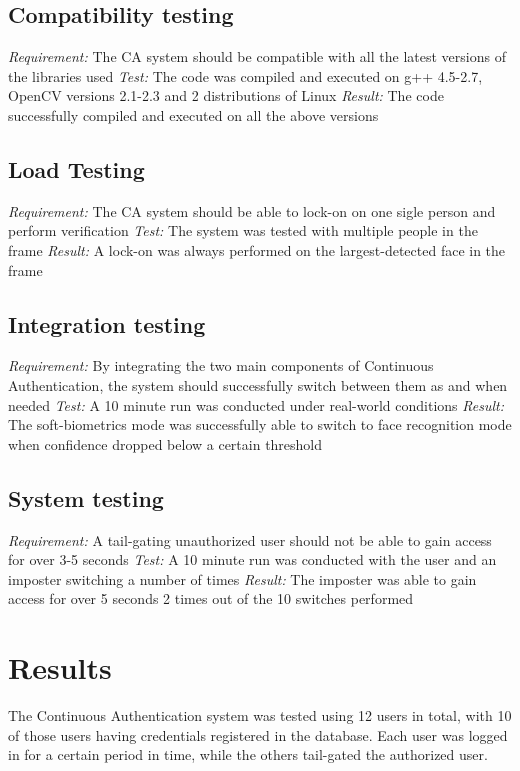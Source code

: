 \documentclass[12pt]{article}			%
\begin{document}
\subsection{ Compatibility testing }
\emph{ Requirement: } The CA system should be compatible with all the latest versions of the libraries used
\emph{ Test: } The code was compiled and executed on g++ 4.5-2.7, OpenCV versions 2.1-2.3 and 2 distributions of Linux
\emph{ Result: } The code successfully compiled and executed on all the above versions

\subsection{ Load Testing }
\emph{ Requirement: } The CA system should be able to lock-on on one sigle person and perform verification 
\emph{ Test: } The system was tested with multiple people in the frame
\emph{ Result: } A lock-on was always performed on the largest-detected face in the frame

\subsection{ Integration testing}
\emph{ Requirement: } By integrating the two main components of Continuous Authentication, the system should successfully switch between them as and when needed
\emph{ Test: } A 10 minute run was conducted under real-world conditions
\emph{ Result: } The soft-biometrics mode was successfully able to switch to face recognition mode when confidence dropped below a certain threshold

\subsection{ System testing }
\emph{ Requirement: } A tail-gating unauthorized user should not be able to gain access for over 3-5 seconds
\emph{ Test: } A 10 minute run was conducted with the user and an imposter switching a number of times
\emph{ Result: } The imposter was able to gain access for over 5 seconds 2 times out of the 10 switches performed

\section{ Results }
The Continuous Authentication system was tested using 12 users in total, with 10 of those users having credentials registered in the database. Each user was logged in for a certain period in time, while the others tail-gated the authorized user. 
\end{document}

